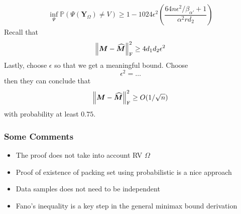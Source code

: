 \documentclass[10pt,xcolor={usenames,dvipsnames,table},aspectratio=169]{beamer}
\begin{document}
\begin{frame}
    \begin{align*}
    \inf_{\Psi} \mathbb{P} (\Psi (\bm{Y}_{\Omega}) \neq V) 
    \geq 1- 1024 \epsilon^2 \left( \dfrac{64 n \epsilon^2/\beta_{\alpha'}+1}{\alpha^2 r d_2} \right)
    \end{align*}
    Recall that 
    \[
    \left\lVert\bm{M} - \widehat{\bm{M}}\right\rVert_{\rm F}^2 \geq 4 d_1 d_2 \epsilon ^2
    \] 
    Lastly, choose $\epsilon$ so that we get a meaningful bound. Choose
    \[
    \epsilon^2 = \ldots 
    \] 
    then they can conclude that
    \[
    \left\lVert\bm{M} - \widehat{\bm{M}}\right\rVert_{\rm F}^2 \geq O(1/\sqrt{n})
    \] 
    with probability at least $0.75$.

\end{frame}

\begin{frame}
    \frametitle{Some Comments}
    \begin{itemize}
        \item The proof does not take into account RV $\Omega$
        \item Proof of existence of packing set using probabilistic is a nice approach
        \item Data samples does not need to be  independent
        \item Fano's inequality is a key step in the general minimax bound derivation
    \end{itemize}
\end{frame}
\end{document}
